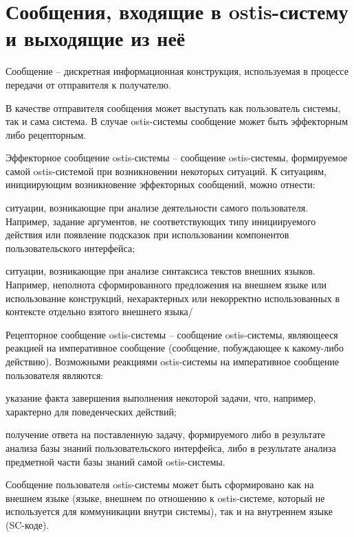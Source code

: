 \section{Сообщения, входящие в ostis-систему и выходящие из неё}
\label{sec_messages}

Сообщение -- дискретная информационная конструкция, используемая в процессе передачи от отправителя к получателю.

В качестве отправителя сообщения может выступать как пользователь системы, так и сама система. В случае ostis-системы сообщение может быть эффекторным либо рецепторным.

Эффекторное сообщение ostis-системы -- сообщение ostis-системы, формируемое самой ostis-системой при возникновении некоторых ситуаций. К ситуациям, инициирующим возникновение эффекторных сообщений, можно отнести:
\begin{textitemize}
	\item ситуации, возникающие при анализе деятельности самого пользователя. Например, задание аргументов, не соответствующих типу инициируемого действия или появление подсказок при использовании компонентов пользовательского интерфейса;
	\item ситуации, возникающие при анализе синтаксиса текстов внешних языков. Например, неполнота сформированного предложения на внешнем языке или использование конструкций, нехарактерных или некорректно использованных в контексте отдельно взятого внешнего языка/
\end{textitemize}

Рецепторное сообщение ostis-системы -- сообщение ostis-системы, являющееся реакцией на императивное сообщение (сообщение, побуждающее к какому-либо действию). Возможными реакциями ostis-системы на императивное сообщение пользователя являются:
\begin{textitemize}
	\item указание факта завершения выполнения некоторой задачи, что, например, характерно для поведенческих действий;
	\item получение ответа на поставленную задачу, формируемого либо в результате анализа базы знаний	пользовательского интерфейса, либо в результате анализа предметной части базы знаний самой ostis-системы.
\end{textitemize}

Сообщение пользователя ostis-системы может быть сформировано как на внешнем языке (языке, внешнем по отношению к ostis-системе, который не используется для коммуникации внутри системы), так и на внутреннем языке (SC-коде).

